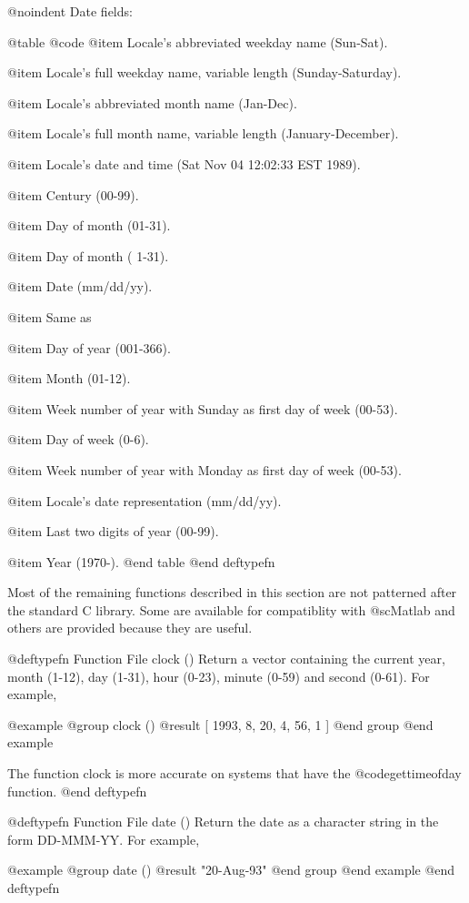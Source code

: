 {{@noindent
Date fields:

@table @code
@item %
Locale's abbreviated weekday name (Sun-Sat).

@item %
Locale's full weekday name, variable length (Sunday-Saturday).

@item %
Locale's abbreviated month name (Jan-Dec).

@item %
Locale's full month name, variable length (January-December).

@item %
Locale's date and time (Sat Nov 04 12:02:33 EST 1989).

@item %
Century (00-99).

@item %
Day of month (01-31).

@item %
Day of month ( 1-31).

@item %
Date (mm/dd/yy).

@item %
Same as %

@item %
Day of year (001-366).

@item %
Month (01-12).

@item %
Week number of year with Sunday as first day of week (00-53).

@item %
Day of week (0-6).

@item %
Week number of year with Monday as first day of week (00-53).

@item %
Locale's date representation (mm/dd/yy).

@item %
Last two digits of year (00-99).

@item %
Year (1970-).
@end table
@end deftypefn

Most of the remaining functions described in this section are not
patterned after the standard C library.  Some are available for
compatiblity with @sc{Matlab} and others are provided because they are
useful.

@deftypefn {Function File} {} clock ()
Return a vector containing the current year, month (1-12), day (1-31),
hour (0-23), minute (0-59) and second (0-61).  For example,

@example
@group
clock ()
     @result{} [ 1993, 8, 20, 4, 56, 1 ]
@end group
@end example

The function clock is more accurate on systems that have the
@code{gettimeofday} function.
@end deftypefn

@deftypefn {Function File} {} date ()
Return the date as a character string in the form DD-MMM-YY.  For
example,

@example
@group
date ()
     @result{} "20-Aug-93"
@end group
@end example
@end deftypefn

}}
